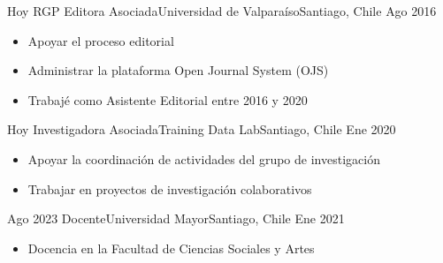 





\begin{experiences}
  \experience
    {Hoy} {RGP Editora Asociada}{Universidad de Valparaíso}{Santiago, Chile} {Ago 2016}
    {\begin{itemize}
    \item Apoyar el proceso editorial
    \item Administrar la plataforma Open Journal System (OJS)
    \item Trabajé como Asistente Editorial entre 2016 y 2020
    \end{itemize}}
    {}
\end{experiences}
\vspace{-2mm}

\begin{experiences}
  \emptySeparator 
  \experience 
    {Hoy} {Investigadora Asociada}{Training Data Lab}{Santiago, Chile} {Ene 2020}
    {\begin{itemize}
    \item Apoyar la coordinación de actividades del grupo de investigación
    \item Trabajar en proyectos de investigación colaborativos
    \end{itemize}}
    {}
\end{experiences}
\vspace{-2mm}

\begin{experiences}
  \emptySeparator 
  \experience 
    {Ago 2023} {Docente}{Universidad Mayor}{Santiago, Chile} {Ene 2021}
    {\begin{itemize}
    \item Docencia en la Facultad de Ciencias Sociales y Artes
    \end{itemize}}
    {}
\end{experiences}
\vspace{-2mm}

